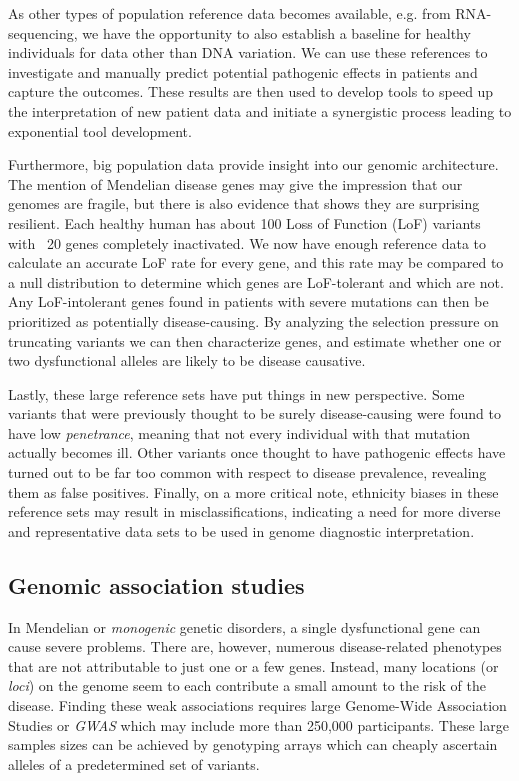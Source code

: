 As other types of population reference data becomes available, e.g. from RNA-sequencing\cite{Deelen_2015}, we have the opportunity to also establish a baseline for healthy individuals for data other than DNA variation.
We can use these references to investigate and manually predict potential pathogenic effects in patients and capture the outcomes.
These results are then used to develop tools to speed up the interpretation of new patient data and initiate a synergistic process leading to exponential tool development.

Furthermore, big population data provide insight into our genomic architecture.
The mention of Mendelian disease genes may give the impression that our genomes are fragile, but there is also evidence that shows they are surprising resilient.
Each healthy human has about 100 Loss of Function (LoF) variants with ~20 genes completely in\-ac\-ti\-va\-ted\cite{MacArthur_2012}.
We now have enough reference data to calculate an accurate LoF rate for every gene\cite{Lek_2016}, and this rate may be compared to a null distribution to determine which genes are LoF-tolerant and which are not. 
Any LoF-intolerant genes found in patients with severe mutations can then be prioritized as potentially disease-causing.
By analyzing the selection pressure on truncating variants we can then characterize genes, and estimate whether one or two dysfunctional alleles are likely to be disease causative\cite{Cassa_2017}.

Lastly, these large reference sets have put things in new perspective.
Some variants that were previously thought to be surely disease-causing were found to have low \textsl{penetrance}, meaning that not every individual with that mutation actually becomes ill\cite{Minikel_2016}.
Other variants once thought to have pathogenic effects have turned out to be far too common with respect to disease prevalence, revealing them as false positives\cite{Walsh_2016}.
Finally, on a more critical note, ethnicity biases in these reference sets may result in misclassifications\cite{Manrai_2016}, indicating a need for more diverse and representative data sets to be used in genome diagnostic interpretation.

\subsection{Genomic association studies}
In Mendelian or \textsl{monogenic} genetic disorders, a single dysfunctional gene can cause severe problems.
There are, however, numerous disease-related phenotypes that are not attributable to just one or a few genes.
Instead, many locations (or \textsl{loci}) on the genome seem to each contribute a small amount to the risk of the disease\cite{McCarthy_2008,Manolio_2009,Boyle_2017}.
Finding these weak associations requires large Genome-Wide Association Studies or \textsl{GWAS} which may include more than 250,000 participants\cite{Wood_2014}.
These large samples sizes can be achieved by genotyping arrays which can cheaply ascertain alleles of a predetermined set of variants.

